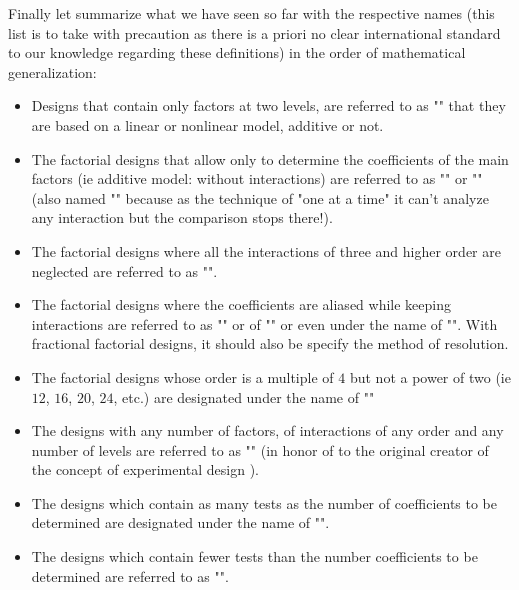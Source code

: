 	\pagebreak
	Finally let summarize what we have seen so far with the respective names (this list is to take with precaution as there is a priori no clear international standard to our knowledge regarding these definitions) in the order of mathematical generalization:
	\begin{itemize}
		\item Designs that contain only factors at two levels, are referred to as "" that they are based on a linear or nonlinear model, additive or not.

		\item The factorial designs that allow only to determine the coefficients of the main factors (ie additive model: without interactions) are referred to as "" or "" (also named "" because as the technique of "one at a time" it can't analyze any interaction but the comparison stops there!).

		\item The factorial designs where all the interactions of three and higher order are neglected are referred to as "".

		\item The factorial designs where the coefficients are aliased while keeping interactions are referred to as "" or of "" or even under the name of "". With fractional factorial designs, it should also be specify the method of resolution.

		\item The factorial designs whose order is a multiple of $4$ but not a power of two (ie $12$, $16$, $20$, $24$, etc.) are designated under the name of ""

		\item The designs with any number of factors, of interactions of any order and any number of levels are referred to as "" (in honor of to the original creator of the concept of experimental design ).

		\item The designs which contain as many tests  as the number of coefficients to be determined are designated under the name of "".

		\item The designs which contain fewer tests than  the number coefficients to be determined are referred to as "".
	\end{itemize}
